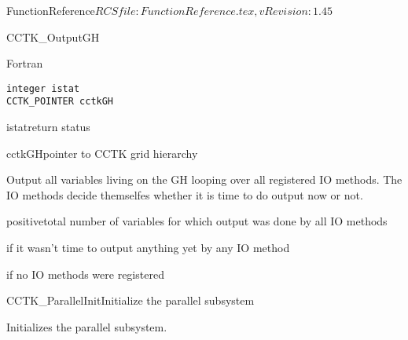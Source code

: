 \begin{cactuspart}{5}{FunctionReference}{$RCSfile: FunctionReference.tex,v $}{$Revision: 1.45 $}
\begin{FunctionDescription}{CCTK\_OutputGH}
\begin{Synopsis}{Fortran}
\begin{verbatim}
integer istat
CCTK_POINTER cctkGH
\end{verbatim}
\end{Synopsis}
\begin{Parameter}{istat}return status\end{Parameter}
\begin{Parameter}{cctkGH}pointer to CCTK grid hierarchy\end{Parameter}
\begin{Discussion}
Output all variables living on the GH looping over all registered IO methods.
The IO methods decide themselfes whether it is time to do output now or not.
\end{Discussion}
\begin{Error}{positive}total number of variables for which output was done by all IO methods\end{Error}
\begin{Error}{0}if it wasn't time to output anything yet by any IO method\end{Error}
\begin{Error}{-1}if no IO methods were registered\end{Error}
\end{FunctionDescription}







\begin{CCTKFunc}{CCTK\_ParallelInit}{Initialize the parallel subsystem}
\label{CCTK-ParallelInit}
\showcargs
\begin{params}
\end{params}
\begin{discussion}
Initializes the parallel subsystem.
\end{discussion}
\end{CCTKFunc}




\end{cactuspart}
